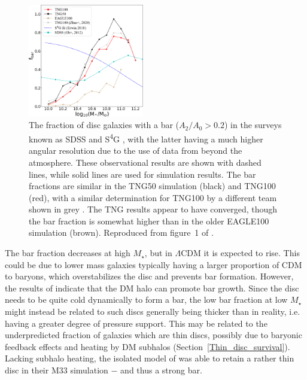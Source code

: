 \documentclass[fleqn,usenatbib,useAMS,onecolumn]{mnras} %
\begin{document}
\begin{figure}
	\centering
	\includegraphics[width=0.45\textwidth]{Roshan_2021_bar_speed_Figure_1}
	\caption{The fraction of disc galaxies with a bar ($A_2/A_0 > 0.2$) in the surveys known as SDSS \citep[cyan;][]{Oh_2012} and S\textsuperscript{4}G \citep[blue;][]{Erwin_2018}, with the latter having a much higher angular resolution due to the use of data from beyond the atmosphere. These observational results are shown with dashed lines, while solid lines are used for simulation results. The bar fractions are similar in the TNG50 simulation (black) and TNG100 (red), with a similar determination for TNG100 by a different team shown in grey \citep{Zhao_2020}. The TNG results appear to have converged, though the bar fraction is somewhat higher than in the older EAGLE100 simulation (brown). Reproduced from figure~1 of \citet{Roshan_2021_bar_speed}.}
	\label{Roshan_2021_bar_fraction}
\end{figure}

The bar fraction decreases at high $M_{\star}$, but in $\Lambda$CDM it is expected to rise. This could be due to lower mass galaxies typically having a larger proportion of CDM to baryons, which overstabilizes the disc and prevents bar formation. However, the results of \citet{Sellwood_2019} indicate that the DM halo can promote bar growth. Since the disc needs to be quite cold dynamically to form a bar, the low bar fraction at low $M_{\star}$ might instead be related to such discs generally being thicker than in reality, i.e. having a greater degree of pressure support. This may be related to the underpredicted fraction of galaxies which are thin discs, possibly due to baryonic feedback effects and heating by DM subhalos (Section~\ref{Thin_disc_survival}). Lacking subhalo heating, the isolated model of \citet{Sellwood_2019} was able to retain a rather thin disc in their M33 simulation $-$ and thus a strong bar.
\end{document}
